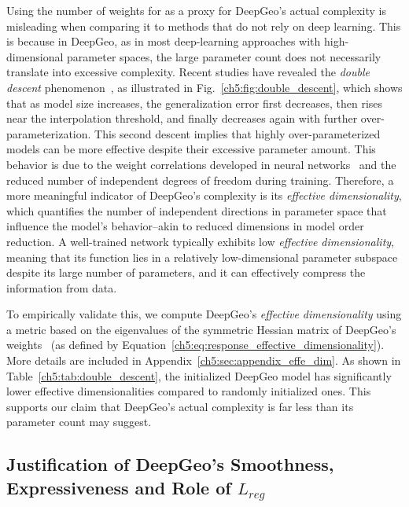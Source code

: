 Using the number of weights for as a proxy for  DeepGeo's actual complexity is misleading when comparing it to methods that do not rely on deep learning. This is because in DeepGeo, as in most deep-learning approaches with high-dimensional parameter spaces,
the large parameter count does not necessarily translate into excessive complexity. Recent studies have revealed the \textit{double descent} phenomenon~\cite{ai.Belkin2019,ai.Spigler2019}, as illustrated in Fig.~\ref{ch5:fig:double_descent}, which shows that as model size increases, the generalization error first decreases, then rises near the interpolation threshold, and finally decreases again with further over-parameterization. This second descent implies that highly over-parameterized models can be more effective despite their excessive parameter amount. This behavior is due to the weight correlations developed in neural networks~\cite{ai.Jin2020b} and the reduced number of independent degrees of freedom during training. Therefore, a more meaningful indicator of DeepGeo's complexity is its \textit{effective dimensionality}, which quantifies the number of independent directions in parameter space that influence the model’s behavior--akin to reduced dimensions in model order reduction. A well-trained network typically exhibits low \textit{effective dimensionality}, meaning that its function lies in a relatively low-dimensional parameter subspace despite its large number of parameters, and it can effectively compress the information from data.


To empirically validate this, we compute DeepGeo’s \textit{effective dimensionality} using a metric based on the eigenvalues of the symmetric Hessian matrix of DeepGeo's weights~\cite{ai.Maddox2020} (as defined by Equation~\ref{ch5:eq:response_effective_dimensionality}). More details are included in Appendix~\ref{ch5:sec:appendix_effe_dim}. As shown in Table~\ref{ch5:tab:double_descent}, the initialized DeepGeo model has significantly lower effective dimensionalities compared to randomly initialized ones. This supports our claim that DeepGeo’s actual complexity is far less than its parameter count may suggest.

\subsection{Justification of DeepGeo's Smoothness, Expressiveness and Role of $L_{reg}$}

